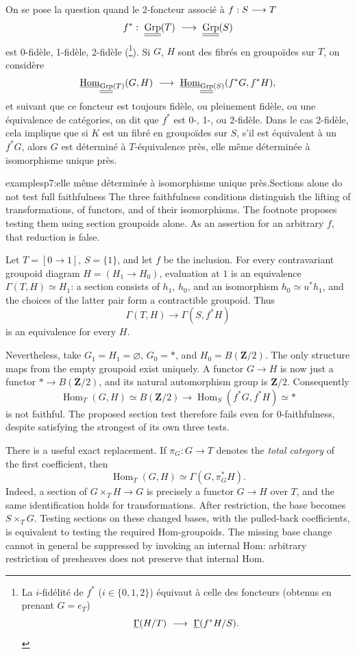 On se pose la question quand le 2-foncteur associé à $f : S \longrightarrow T$
\[
f^* :\ \underline{\underline{\mathrm{Grp}}}(T) \ \longrightarrow\ \underline{\underline{\mathrm{Grp}}}(S)
\]
est 0-fidèle, 1-fidèle, 2-fidèle (\footnote[2]{La $i$-fidélité de $f^*$ ($i \in \{0,1,2\}$) équivaut à celle des foncteurs (obtenus en prenant $G = e_T$)
\[
\underline{\Gamma}(H/T) \ \fl\ \underline{\Gamma}(f^*H/S).
\]}). Si $G$, $H$ sont des fibrés en groupoïdes sur $T$, on considère
\[
\uHom_{\uuGrp(T)}(G,H) \ \fl\ \uHom_{\uuGrp(S)}(f^*G, f^*H),
\]
et suivant que ce foncteur est toujours fidèle, ou pleinement fidèle, ou une équivalence de catégories, on dit que $f^*$ est 0-, 1-, ou 2-fidèle. Dans le cas 2-fidèle, cela implique que si $K$ est un fibré en groupoïdes sur $S$, s'il est équivalent à un $f^*G$, alors $G$ est déterminé à $T$-équivalence près, elle même déterminée à isomorphisme unique près.

\begin{dcomment}{examples}{p7:elle même déterminée à isomorphisme unique près.}{Sections alone do not test full faithfulness}
The three faithfulness conditions distinguish the lifting of transformations, of functors, and of their isomorphisms. The footnote proposes testing them using section groupoids alone. As an assertion for an arbitrary $f$, that reduction is false.

Let $T=[0\to1]$, $S=\{1\}$, and let $f$ be the inclusion. For every contravariant groupoid diagram $H=(H_1\to H_0)$, evaluation at $1$ is an equivalence $\Gamma(T,H)\simeq H_1$: a section consists of $h_1$, $h_0$, and an isomorphism $h_0\simeq u^*h_1$, and the choices of the latter pair form a contractible groupoid. Thus
\[
 \Gamma(T,H)\longrightarrow\Gamma(S,f^*H)
\]
is an equivalence for every $H$.

Nevertheless, take $G_1=H_1=\varnothing$, $G_0=*$, and $H_0=B(\mathbf Z/2)$. The only structure maps from the empty groupoid exist uniquely. A functor $G\to H$ is now just a functor $*\to B(\mathbf Z/2)$, and its natural automorphism group is $\mathbf Z/2$. Consequently
\[
 \operatorname{Hom}_T(G,H)\simeq B(\mathbf Z/2)
 \longrightarrow
 \operatorname{Hom}_S(f^*G,f^*H)\simeq *
\]
is not faithful. The proposed section test therefore fails even for $0$-faithfulness, despite satisfying the strongest of its own three tests.

There is a useful exact replacement. If $\pi_G:G\to T$ denotes the \emph{total category} of the first coefficient, then
\[
 \operatorname{Hom}_T(G,H)
 \simeq\Gamma(G,\pi_G^*H).
\]
Indeed, a section of $G\times_T H\to G$ is precisely a functor $G\to H$ over $T$, and the same identification holds for transformations. After restriction, the base becomes $S\times_T G$. Testing sections on these changed bases, with the pulled-back coefficients, is equivalent to testing the required Hom-groupoids. The missing base change cannot in general be suppressed by invoking an internal Hom: arbitrary restriction of presheaves does not preserve that internal Hom.
\end{dcomment}


